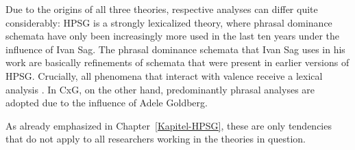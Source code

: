 Due to the origins of all three theories, respective analyses can differ quite considerably: HPSG is a strongly lexicalized theory, where
phrasal dominance schemata have only been increasingly more used in the last ten years under the
influence of Ivan Sag. The phrasal dominance schemata that Ivan Sag uses in
his work are basically refinements of schemata that were present in earlier versions of
HPSG. Crucially, all phenomena that interact with valence receive a lexical analysis \citep*[Section~2.3]{SBK2012a}.
In CxG, on the other hand, predominantly phrasal analyses are adopted due to the influence of Adele
Goldberg.%

As already emphasized in Chapter~\ref{Kapitel-HPSG}, these are only tendencies that do not apply to all researchers working in the
theories in question.


\bigskip
{}

